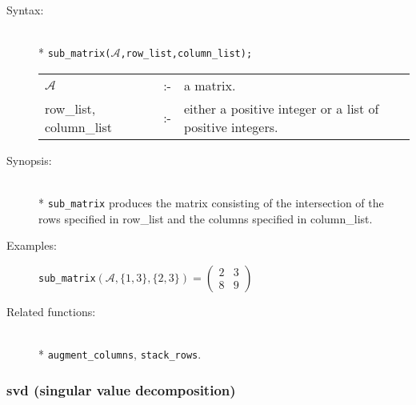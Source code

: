 \begin{description}
\item[Syntax:]\mbox{}\\*
\texttt{sub\_matrix($\mathcal{A}$,row\_list,column\_list);}\\[2mm]
\begin{tabular}{l l p{.605\linewidth}}
$\mathcal{A}$              &:-& a matrix. \\
row\_list, column\_list &:-& either a
positive integer or a list of positive integers.
\end{tabular}

\item[Synopsis:]\mbox{}\\*
\texttt{sub\_matrix} produces the matrix consisting of the
              intersection of the rows specified in row\_list and the
columns specified in column\_list.

\item[Examples:]
\begin{flushleft}
\texttt{sub\_matrix}\((\mathcal{A},\{1,3\},\{2,3\}) =
        \begin{pmatrix} 2 & 3 \\ 8 & 9 \end{pmatrix}\)
\end{flushleft}

\item[Related functions:]\mbox{}\\*
\texttt{augment\_columns}, \texttt{stack\_rows}.
\end{description}


\subsubsection{svd (singular value decomposition)}
\label{linalg:svd}
\hypertarget{operator:SVD}{}


